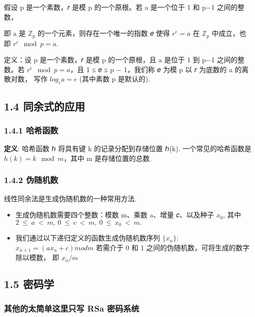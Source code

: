 假设 p 是一个素数，𝑟 是模 p 的一个原根。若 a 是一个位于 1 和 p−1
之间的整数，

即 a 是 \(ℤ_p\) 的一个元素，则存在一个唯一的指数 𝑒 使得 \(𝑟^e = a\) 在
\(ℤ_p\) 中成立，也即 \(𝑟^e\mod p = a\).

定义：设 p 是一个素数，𝑟 是模 p 的一个原根，且 a 是位于 1 到 p−1
之间的整数。若 \(𝑟^e\mod p = a\)，且 1 ≤ 𝑒 ≤ p − 1，我们称 𝑒 为模 p 以 𝑟
为底数的 a 的离散对数， 写作 \(log_r a = 𝑒\) (其中素数 p 是默认的).

\subsection{1.4
同余式的应用}\label{ux540cux4f59ux5f0fux7684ux5e94ux7528}

\subsubsection{1.4.1 哈希函数}\label{ux54c8ux5e0cux51fdux6570}

\textbf{定义}: 哈希函数 ℎ 将具有键 k 的记录分配到存储位置 ℎ(k).
一个常见的哈希函数是 \(ℎ(k) = k\mod m\)，其中 m 是存储位置的总数.

\subsubsection{1.4.2 伪随机数}\label{ux4f2aux968fux673aux6570}

线性同余法是生成伪随机数的一种常用方法.

\begin{itemize}
\tightlist
\item
  生成伪随机数需要四个整数：模数 m、乘数 a、增量 𝑐、以及种子 \(x_0\),
  其中 \(2\ ≤\ a\ <\ m,\ 0\ ≤\ 𝑐\ <\ m,\ 0\ ≤\ x_0\ <\ m.\)
\item
  我们通过以下递归定义的函数生成伪随机数序列 \(\{x_𝑛\}\):
  \(x_{n+1} = (ax_n + 𝑐) mod m\) 若需介于 0 和 1
  之间的伪随机数，可将生成的数字除以模数， 即 \(x_𝑛 /m\)
\end{itemize}

\subsection{1.5 密码学}\label{ux5bc6ux7801ux5b66}

\subsubsection{其他的太简单这里只写 RSa
密码系统}\label{ux5176ux4ed6ux7684ux592aux7b80ux5355ux8fd9ux91ccux53eaux5199-rsa-ux5bc6ux7801ux7cfbux7edf}

